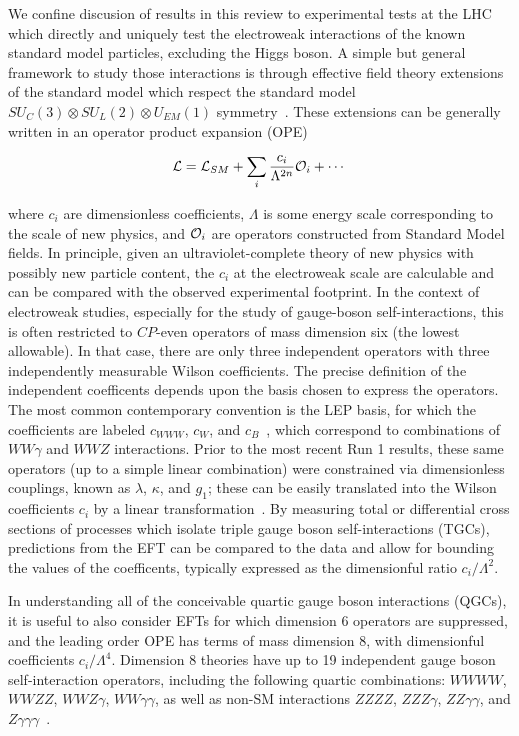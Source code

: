 
We confine discusion of results in this review to experimental tests
at the LHC which directly and uniquely test the electroweak
interactions of the known standard model particles, excluding the
Higgs boson. A simple but general framework to study those
interactions is through effective field theory extensions of the
standard model which respect the standard model $SU_C(3) \otimes
SU_L(2) \otimes U_{EM}(1)$
symmetry~\cite{Weinberg:1978kz,Weinberg:1980wa,Georgi:1994qn}.  These
extensions can be generally written in an operator product expansion
(OPE)

$$ \mathcal{L} = \mathcal{L}_{SM} + \sum_i \frac{c_i}{\Lambda^{2n}}{\cal O}_i + \cdots$$

where $c_i$ are dimensionless coefficients, $\Lambda$ is some energy
scale corresponding to the scale of new physics, and ${\cal O}_i$ are
operators constructed from Standard Model fields.  In principle, given
an ultraviolet-complete theory of new physics with possibly new
particle content, the $c_i$ at the electroweak scale are calculable
and can be compared with the observed experimental footprint. In the
context of electroweak studies, especially for the study of
gauge-boson self-interactions, this is often restricted to $CP$-even
operators of mass dimension six (the
lowest allowable).  In that case, there are only three independent
operators with three independently measurable Wilson coefficients. The
precise definition of the independent coefficents depends upon the
basis chosen to express the operators.  The most common contemporary
convention is the LEP basis, for which the coefficients are labeled
$c_{WWW}$, $c_W$, and $c_B$~\cite{Hagiwara:1993ck,Degrande:2012wf},
which correspond to combinations of $WW\gamma$ and $WWZ$ interactions.
Prior to the most recent Run 1 results, these same operators (up to a
simple linear combination) were constrained via dimensionless
couplings, known as $\lambda$, $\kappa$, and $g_1$; these can be
easily translated into the Wilson coefficients $c_i$ by a linear
transformation~\cite{Degrande:2012wf}.  By measuring total or
differential cross sections of processes which isolate triple gauge
boson self-interactions (TGCs), predictions from the EFT can be
compared to the data and allow for bounding the values of the
coefficents, typically expressed as the dimensionful ratio
$c_i/\Lambda^2$.

In understanding all of the conceivable quartic gauge boson
interactions (QGCs), it is useful to also consider EFTs for which
dimension 6 operators are suppressed, and the leading order OPE has
terms of mass dimension 8, with dimensionful coefficients
$c_i/\Lambda^4$.  Dimension 8 theories have up to 19 independent gauge
boson self-interaction operators, including the following quartic
combinations: $WWWW$, $WWZZ$, $WWZ\gamma$, $WW\gamma\gamma$, as well
as non-SM interactions $ZZZZ$, $ZZZ\gamma$, $ZZ\gamma\gamma$, and
$Z\gamma\gamma\gamma$~\cite{Eboli:2006wa,Degrande:2013kka}.

